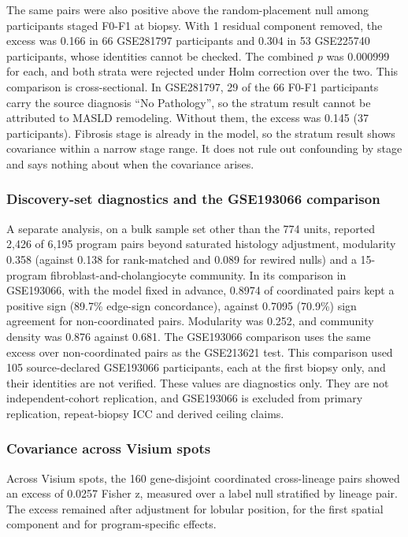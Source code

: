 The same pairs were also positive above the random-placement null among participants staged F0-F1 at biopsy. With 1 residual component removed, the excess was 0.166 in 66 GSE281797 participants and 0.304 in 53 GSE225740 participants, whose identities cannot be checked. The combined \emph{p} was 0.000999 for each, and both strata were rejected under Holm correction over the two. This comparison is cross-sectional. In GSE281797, 29 of the 66 F0-F1 participants carry the source diagnosis ``No Pathology'', so the stratum result cannot be attributed to MASLD remodeling. Without them, the excess was 0.145 (37 participants). Fibrosis stage is already in the model, so the stratum result shows covariance within a narrow stage range. It does not rule out confounding by stage and says nothing about when the covariance arises.

\subsubsection{Discovery-set diagnostics and the GSE193066 comparison}\label{discovery-set-diagnostics-and-the-gse193066-comparison}

A separate analysis, on a bulk sample set other than the 774 units, reported 2,426 of 6,195 program pairs beyond saturated histology adjustment, modularity 0.358 (against 0.138 for rank-matched and 0.089 for rewired nulls) and a 15-program fibroblast-and-cholangiocyte community. In its comparison in GSE193066, with the model fixed in advance, 0.8974 of coordinated pairs kept a positive sign (89.7\% edge-sign concordance), against 0.7095 (70.9\%) sign agreement for non-coordinated pairs. Modularity was 0.252, and community density was 0.876 against 0.681. The GSE193066 comparison uses the same excess over non-coordinated pairs as the GSE213621 test. This comparison used 105 source-declared GSE193066 participants, each at the first biopsy only, and their identities are not verified. These values are diagnostics only. They are not independent-cohort replication, and GSE193066 is excluded from primary replication, repeat-biopsy ICC and derived ceiling claims.

\subsubsection{Covariance across Visium spots}\label{covariance-across-visium-spots}

Across Visium spots, the 160 gene-disjoint coordinated cross-lineage pairs showed an excess of 0.0257 Fisher z, measured over a label null stratified by lineage pair. The excess remained after adjustment for lobular position, for the first spatial component and for program-specific effects.

